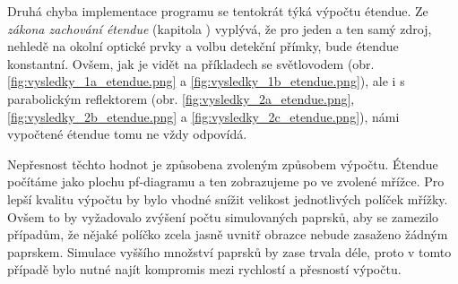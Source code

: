 Druhá chyba implementace programu se tentokrát týká výpočtu étendue. Ze \emph{zákona zachování étendue} (kapitola ) vyplývá, že pro jeden a ten samý zdroj, nehledě na okolní optické prvky a volbu detekční přímky, bude étendue konstantní. Ovšem, jak je vidět na příkladech se světlovodem (obr. \ref{fig:vysledky_1a_etendue.png} a \ref{fig:vysledky_1b_etendue.png}), ale i s parabolickým reflektorem (obr. \ref{fig:vysledky_2a_etendue.png}, \ref{fig:vysledky_2b_etendue.png} a \ref{fig:vysledky_2c_etendue.png}), námi vypočtené étendue tomu ne vždy odpovídá.

Nepřesnost těchto hodnot je způsobena zvoleným způsobem výpočtu. Étendue počítáme jako plochu pf-diagramu a ten zobrazujeme po ve zvolené mřížce. Pro lepší kvalitu výpočtu by bylo vhodné snížit velikost jednotlivých políček mřížky. Ovšem to by vyžadovalo zvýšení počtu simulovaných paprsků, aby se zamezilo případům, že nějaké políčko zcela jasně uvnitř obrazce nebude zasaženo žádným paprskem. Simulace vyššího množství paprsků by zase trvala déle, proto v tomto případě bylo nutné najít kompromis mezi rychlostí a přesností výpočtu.

